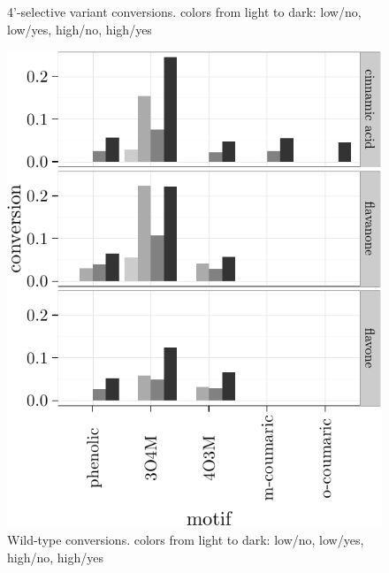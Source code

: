 \documentclass[]{tufte-handout}
\begin{document}
\begin{figure}
\caption{4'-selective variant conversions. colors from light to dark: low/no, low/yes, high/no, high/yes}
\end{figure}\begin{figure}
 \includegraphics{tufte_files/figure-latex/unnamed-chunk-14-4.pdf}
\caption{Wild-type conversions. colors from light to dark: low/no, low/yes, high/no, high/yes}
\end{figure}\begin{figure}

\end{figure}
\end{document}
